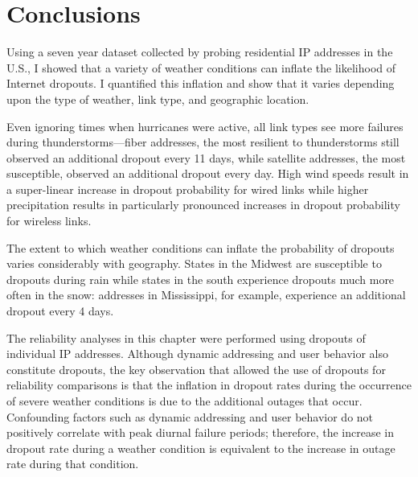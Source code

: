 
\section{Conclusions}

Using a seven year dataset collected by probing residential IP addresses in the U.S., I showed that a variety of weather conditions can inflate the likelihood of Internet dropouts. I quantified this inflation and show that it varies depending upon the type of weather, link type, and geographic location. 

Even ignoring times when hurricanes were active, all link types see more failures during thunderstorms---fiber addresses, the most resilient to thunderstorms still observed an additional dropout every 11 days, while satellite addresses, the most susceptible, observed an additional dropout every day. High wind speeds result in a super-linear increase in dropout probability for wired links while higher precipitation results in particularly pronounced increases in dropout probability for wireless links.

The extent to which weather conditions can inflate the probability of dropouts varies considerably with geography. States in the Midwest are susceptible to dropouts during rain while states in the south experience dropouts much more often in the snow: addresses in Mississippi, for example, experience an additional dropout every 4 days. 

The reliability analyses in this chapter were performed using dropouts of individual IP addresses. Although dynamic addressing and user behavior also constitute dropouts, the key observation that allowed the use of dropouts for reliability comparisons is that the inflation in dropout rates during the occurrence of severe weather conditions is due to the additional outages that occur. Confounding factors such as dynamic addressing and user behavior do not positively correlate with peak diurnal failure periods; therefore, the increase in dropout rate during a weather condition is equivalent to the increase in outage rate during that condition. 